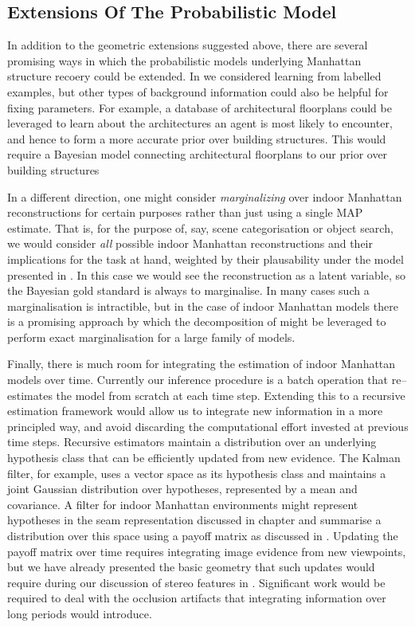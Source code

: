 \subsection{Extensions Of The Probabilistic Model}

In addition to the geometric extensions suggested above, there are
several promising ways in which the probabilistic models underlying
Manhattan structure recoery could be extended. In 
we considered learning from labelled examples, but other types of
background information could also be helpful for fixing
parameters. For example, a database of architectural floorplans could
be leveraged to learn about the architectures an agent is most likely
to encounter, and hence to form a more accurate prior over building
structures. This would require a Bayesian model connecting
architectural floorplans to our prior over building structures

In a different direction, one might consider \textit{marginalizing}
over indoor Manhattan reconstructions for certain purposes rather than
just using a single MAP estimate. That is, for the purpose of, say,
scene categorisation or object search, we would consider \textit{all}
possible indoor Manhattan reconstructions and their implications for
the task at hand, weighted by their plausability under the model
presented in . In this case we would see the
reconstruction as a latent variable, so the Bayesian gold standard is
always to marginalise. In many cases such a marginalisation is
intractible, but in the case of indoor Manhattan models there is a
promising approach by which the decomposition of 
might be leveraged to perform exact marginalisation for a large family
of models.

Finally, there is much room for integrating the estimation of indoor
Manhattan models over time. Currently our inference procedure is a
batch operation that re--estimates the model from scratch at each time
step. Extending this to a recursive estimation framework would allow
us to integrate new information in a more principled way, and avoid
discarding the computational effort invested at previous time
steps. Recursive estimators maintain a distribution over an underlying
hypothesis class that can be efficiently updated from new
evidence. The Kalman filter, for example, uses a vector space as its
hypothesis class and maintains a joint Gaussian distribution over
hypotheses, represented by a mean and covariance. A filter for indoor
Manhattan environments might represent hypotheses in the seam
representation discussed in chapter  and summarise a
distribution over this space using a payoff matrix as discussed in
. Updating the payoff matrix over time requires
integrating image evidence from new viewpoints, but we have already
presented the basic geometry that such updates would require during
our discussion of stereo features in . Significant
work would be required to deal with the occlusion artifacts that
integrating information over long periods would introduce.

